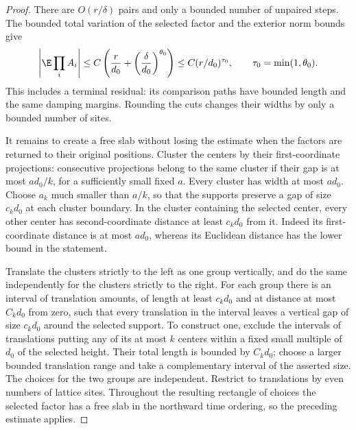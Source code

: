 \begin{proof}
There are \(O(r/\delta)\) pairs and only a bounded number of unpaired
steps. The bounded total variation of the selected factor and the
exterior norm bounds give
\[
 \left|\E\prod_iA_i\right|
 \le C\left(\frac r{d_0}
               +\left(\frac\delta{d_0}\right)^{\theta_0}\right)
 \le C(r/d_0)^{\tau_0},\qquad \tau_0=\min(1,\theta_0).
\]
This includes a terminal residual: its comparison paths have bounded
length and the same damping margins. Rounding the cuts changes their
widths by only a bounded number of sites.

It remains to create a free slab without losing the estimate when the
factors are returned to their original positions. Cluster the centers
by their first-coordinate projections: consecutive projections belong
to the same cluster if their gap is at most \(a d_0/k\), for a sufficiently
small fixed \(a\). Every cluster has width at most \(a d_0\).
Choose \(a_k\) much smaller than \(a/k\), so that the supports preserve
a gap of size \(c_kd_0\) at each cluster boundary.
In the cluster containing the selected center, every other center has
second-coordinate distance at least \(c_kd_0\) from it. Indeed its
first-coordinate distance is at most \(a d_0\), whereas its Euclidean
distance has the lower bound in the statement.

Translate the clusters strictly to the left as one group vertically,
and do the same independently for the clusters strictly to the right.
For each group there is an interval of translation amounts, of length
at least \(c_kd_0\) and at distance at most \(C_kd_0\) from zero, such
that every translation in the interval leaves a vertical gap of size
\(c_kd_0\) around the selected support. To construct one, exclude the
intervals of translations putting any of its at most \(k\) centers
within a fixed small multiple of \(d_0\) of the selected height.
Their total length is bounded by \(C_kd_0\); choose a larger bounded
translation range and take a complementary interval of the asserted
size. The choices for the two groups are independent. Restrict to
translations by even numbers of lattice sites. Throughout the resulting
rectangle of choices the selected factor has a free slab in the
northward time ordering, so the preceding estimate applies.


\end{proof}
